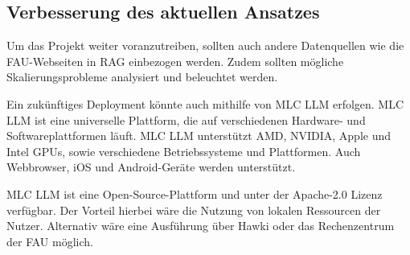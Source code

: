\documentclass[german,report]{i1thesis}
\begin{document}
\subsection{Verbesserung des aktuellen Ansatzes}%
\label{subsec:verb}



Um das Projekt weiter voranzutreiben, sollten auch andere Datenquellen wie die \ac{FAU}-Webseiten \autocite{fau-quelle} in \ac{RAG} einbezogen werden.
Zudem sollten mögliche Skalierungsprobleme analysiert und beleuchtet werden.

Ein zukünftiges Deployment könnte auch mithilfe von \ac{MLC LLM} \autocite{mlc_llm} erfolgen. \ac{MLC LLM} ist eine universelle Plattform, die auf verschiedenen Hardware- und Softwareplattformen läuft.
\ac{MLC LLM} unterstützt AMD, NVIDIA, Apple und Intel \acp{GPU}, sowie verschiedene Betriebssysteme und Plattformen.
Auch Webbrowser, iOS und Android-Geräte werden unterstützt.


\ac{MLC LLM} ist eine Open-Source-Plattform und unter der Apache-2.0 Lizenz verfügbar. \autocite{mlc_llm_github}
Der Vorteil hierbei wäre die Nutzung von lokalen Ressourcen der Nutzer.
Alternativ wäre eine Ausführung über Hawki oder das Rechenzentrum der \ac{FAU} möglich.
\end{document}
